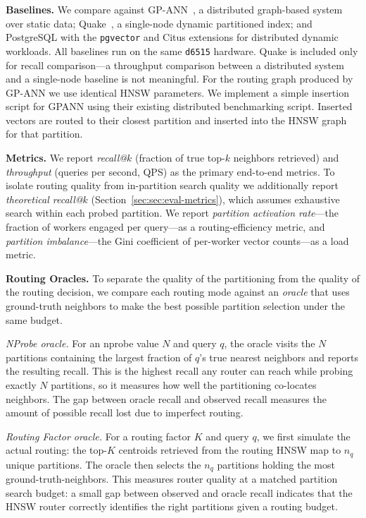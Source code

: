 \documentclass[sigconf,review,anonymous]{acmart}
\begin{document}
 \textbf{Baselines.} We compare against GP-ANN~\cite{gottensuren2025unleashing}, a distributed graph-based system over static data; Quake~\cite{mohoney2025quake}, a single-node dynamic partitioned index; and PostgreSQL with the \texttt{pgvector} and Citus extensions \cite{postgresql,pgvector,cubukcu2021citus} for distributed dynamic workloads. All baselines run on the same \texttt{d6515} hardware. Quake \cite{mohoney2025quake} is included only for recall comparison---a throughput comparison between a distributed system and a single-node baseline is not meaningful. For the routing graph produced by GP-ANN we use identical HNSW parameters. We implement a simple insertion script for GPANN using their existing distributed benchmarking script. Inserted vectors are routed to their closest partition and inserted into the HNSW graph for that partition.

\textbf{Metrics.} We report \emph{recall@$k$} (fraction of true top-$k$ neighbors retrieved) and \emph{throughput} (queries per second, QPS) as the primary end-to-end metrics. To isolate routing quality from in-partition search quality we additionally report \emph{theoretical recall@$k$} (Section~\ref{sec:sec:eval-metrics}), which assumes exhaustive search within each probed partition. We report \emph{partition activation rate}---the fraction of workers engaged per query---as a routing-efficiency metric, and \emph{partition imbalance}---the Gini coefficient of per-worker vector counts---as a load metric. 

\textbf{Routing Oracles.}
\label{sec:routing-oracles}
To separate the quality of the partitioning from the quality of the routing decision, we compare each routing mode against an \emph{oracle} that uses ground-truth neighbors to make the best possible partition selection under the same budget.

\textit{NProbe oracle.} For an nprobe value $N$ and query $q$, the oracle visits the $N$ partitions containing the largest fraction of $q$'s true nearest neighbors and reports the resulting recall. This is the highest recall any router can reach while probing exactly $N$ partitions, so it measures how well the partitioning co-locates neighbors. The gap between oracle recall and observed recall measures the amount of possible recall lost due to imperfect routing.

\textit{Routing Factor oracle.} %
For a routing factor $K$ and query $q$, we first simulate the actual routing: the top-$K$ centroids retrieved from the routing HNSW map to $n_q$ unique partitions. The oracle then selects the $n_q$ partitions holding the most ground-truth-neighbors. This measures router quality at a matched partition search budget: a small gap between observed and oracle recall indicates that the HNSW router correctly identifies the right partitions given a routing budget.
\end{document}
